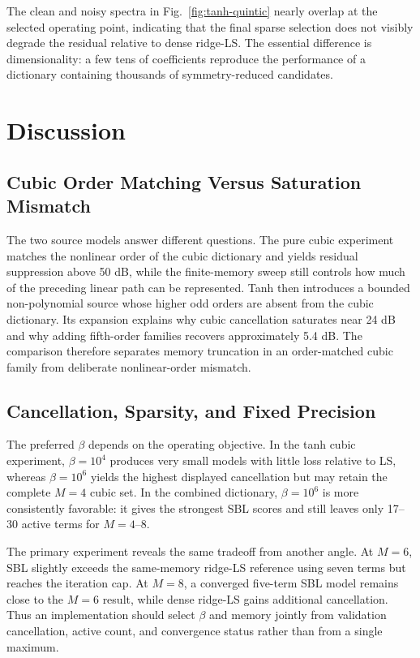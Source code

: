 \documentclass[conference]{IEEEtran}
\begin{document}
The clean and noisy spectra in Fig.~\ref{fig:tanh-quintic} nearly overlap at the selected operating point, indicating that the final sparse selection does not visibly degrade the residual relative to dense ridge-LS. The essential difference is dimensionality: a few tens of coefficients reproduce the performance of a dictionary containing thousands of symmetry-reduced candidates.

\section{Discussion}
\label{sec:discussion}
\subsection{Cubic Order Matching Versus Saturation Mismatch}
The two source models answer different questions. The pure cubic experiment matches the nonlinear order of the cubic dictionary and yields residual suppression above 50 dB, while the finite-memory sweep still controls how much of the preceding linear path can be represented. Tanh then introduces a bounded non-polynomial source whose higher odd orders are absent from the cubic dictionary. Its expansion explains why cubic cancellation saturates near 24 dB and why adding fifth-order families recovers approximately 5.4 dB. The comparison therefore separates memory truncation in an order-matched cubic family from deliberate nonlinear-order mismatch.

\subsection{Cancellation, Sparsity, and Fixed Precision}
The preferred $\beta$ depends on the operating objective. In the tanh cubic experiment, $\beta=10^4$ produces very small models with little loss relative to LS, whereas $\beta=10^6$ yields the highest displayed cancellation but may retain the complete $M=4$ cubic set. In the combined dictionary, $\beta=10^6$ is more consistently favorable: it gives the strongest SBL scores and still leaves only 17--30 active terms for $M=4$--8.

The primary experiment reveals the same tradeoff from another angle. At $M=6$, SBL slightly exceeds the same-memory ridge-LS reference using seven terms but reaches the iteration cap. At $M=8$, a converged five-term SBL model remains close to the $M=6$ result, while dense ridge-LS gains additional cancellation. Thus an implementation should select $\beta$ and memory jointly from validation cancellation, active count, and convergence status rather than from a single maximum.
\end{document}
